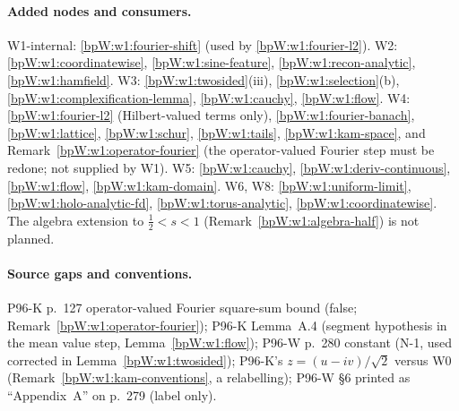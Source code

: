 \paragraph{Added nodes and consumers.}
W1-internal: \ref{bpW:w1:fourier-shift} (used by \ref{bpW:w1:fourier-l2}).
W2: \ref{bpW:w1:coordinatewise}, \ref{bpW:w1:sine-feature}, \ref{bpW:w1:recon-analytic}, \ref{bpW:w1:hamfield}.
W3: \ref{bpW:w1:twosided}(iii), \ref{bpW:w1:selection}(b), \ref{bpW:w1:complexification-lemma}, \ref{bpW:w1:cauchy},
\ref{bpW:w1:flow}. W4: \ref{bpW:w1:fourier-l2} (Hilbert-valued terms only), \ref{bpW:w1:fourier-banach},
\ref{bpW:w1:lattice}, \ref{bpW:w1:schur}, \ref{bpW:w1:tails}, \ref{bpW:w1:kam-space}, and
Remark~\ref{bpW:w1:operator-fourier} (the operator-valued Fourier step must be redone; not supplied by W1).
W5: \ref{bpW:w1:cauchy}, \ref{bpW:w1:deriv-continuous}, \ref{bpW:w1:flow}, \ref{bpW:w1:kam-domain}. W6, W8: \ref{bpW:w1:uniform-limit},
\ref{bpW:w1:holo-analytic-fd}, \ref{bpW:w1:torus-analytic}, \ref{bpW:w1:coordinatewise}. The algebra extension to
$\frac12<s<1$ (Remark~\ref{bpW:w1:algebra-half}) is not planned.

\paragraph{Source gaps and conventions.} P96-K p.~127 operator-valued Fourier square-sum bound (false;
Remark~\ref{bpW:w1:operator-fourier}); P96-K Lemma~A.4 (segment hypothesis in the mean value step,
Lemma~\ref{bpW:w1:flow}); P96-W p.~280 constant (N-1, used corrected in Lemma~\ref{bpW:w1:twosided}); P96-K's
$z=(u-iv)/\sqrt2$ versus W0 (Remark~\ref{bpW:w1:kam-conventions}, a relabelling); P96-W \S6 printed as ``Appendix~A''
on p.~279 (label only).
